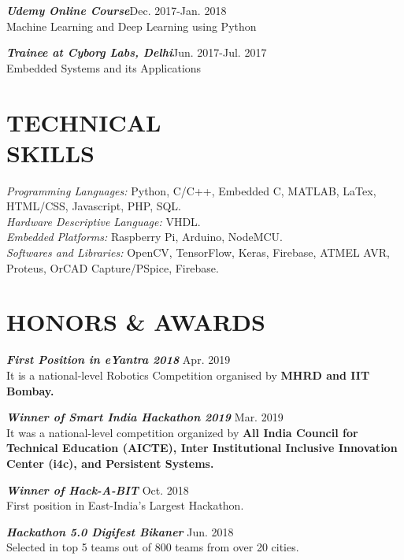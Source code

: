 \documentclass[margin, 10pt]{res} %
\begin{document}
\begin{resume}
{\sl \bf{Udemy Online Course}}\hfill Dec. 2017-Jan. 2018\\
Machine Learning and Deep Learning using Python


{\sl \bf{Trainee at Cyborg Labs, Delhi}}\hfill Jun. 2017-Jul. 2017\\
Embedded Systems and its Applications

\section{TECHNICAL \\ SKILLS} 

{\sl Programming Languages:} Python, C/C++, Embedded C, MATLAB, LaTex, HTML/CSS, Javascript, PHP, SQL.  \\
{\sl Hardware Descriptive Language:} VHDL. \\
{\sl Embedded Platforms:} Raspberry Pi, Arduino, NodeMCU. \\
{\sl Softwares and Libraries:} OpenCV, TensorFlow, Keras, Firebase, ATMEL AVR, Proteus, OrCAD Capture/PSpice, Firebase. 



\section{HONORS \& AWARDS}


{\sl \bf{First Position in eYantra 2018} } \hfill Apr. 2019\\It is a national-level Robotics Competition organised by \bf{MHRD} and \bf{IIT Bombay}.

{\sl \bf{Winner of Smart India Hackathon 2019} } \hfill Mar. 2019\\It was a national-level competition organized by \bf{All India Council for Technical Education (AICTE), Inter Institutional Inclusive Innovation Center (i4c),} and \bf{Persistent Systems}.

{\sl \bf{Winner of Hack-A-BIT} } \hfill Oct. 2018\\ First position in East-India's Largest Hackathon.

{\sl \bf{Hackathon 5.0 Digifest Bikaner} } \hfill Jun. 2018 \\ Selected in top 5 teams out of 800 teams from over 20 cities.


\end{resume}
\end{document}
